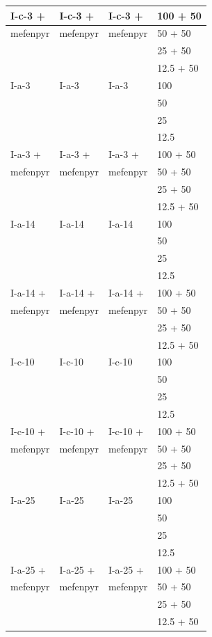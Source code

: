 \documentclass[11pt,a4paper]{article}
\begin{document}
\begin{table}[h]
\begin{tabular}{|l|l|l|l|}
I-c-3 + & I-c-3 + & I-c-3 + & 100 + 50 \\ \hline
mefenpyr & mefenpyr & mefenpyr & 50 + 50 \\ \hline
 &  &  & 25 + 50 \\ \hline
 &  &  & 12.5 + 50 \\ \hline
I-a-3 & I-a-3 & I-a-3 & 100 \\ \hline
 &  &  & 50 \\ \hline
 &  &  & 25 \\ \hline
 &  &  & 12.5 \\ \hline
I-a-3 + & I-a-3 + & I-a-3 + & 100 + 50 \\ \hline
mefenpyr & mefenpyr & mefenpyr & 50 + 50 \\ \hline
 &  &  & 25 + 50 \\ \hline
 &  &  & 12.5 + 50 \\ \hline
I-a-14 & I-a-14 & I-a-14 & 100 \\ \hline
 &  &  & 50 \\ \hline
 &  &  & 25 \\ \hline
 &  &  & 12.5 \\ \hline
I-a-14 + & I-a-14 + & I-a-14 + & 100 + 50 \\ \hline
mefenpyr & mefenpyr & mefenpyr & 50 + 50 \\ \hline
 &  &  & 25 + 50 \\ \hline
 &  &  & 12.5 + 50 \\ \hline
I-c-10 & I-c-10 & I-c-10 & 100 \\ \hline
 &  &  & 50 \\ \hline
 &  &  & 25 \\ \hline
 &  &  & 12.5 \\ \hline
I-c-10 + & I-c-10 + & I-c-10 + & 100 + 50 \\ \hline
mefenpyr & mefenpyr & mefenpyr & 50 + 50 \\ \hline
 &  &  & 25 + 50 \\ \hline
 &  &  & 12.5 + 50 \\ \hline
I-a-25 & I-a-25 & I-a-25 & 100 \\ \hline
 &  &  & 50 \\ \hline
 &  &  & 25 \\ \hline
 &  &  & 12.5 \\ \hline
I-a-25 + & I-a-25 + & I-a-25 + & 100 + 50 \\ \hline
mefenpyr & mefenpyr & mefenpyr & 50 + 50 \\ \hline
 &  &  & 25 + 50 \\ \hline
 &  &  & 12.5 + 50 \\ \hline

\end{tabular}
\end{table}
\end{document}
